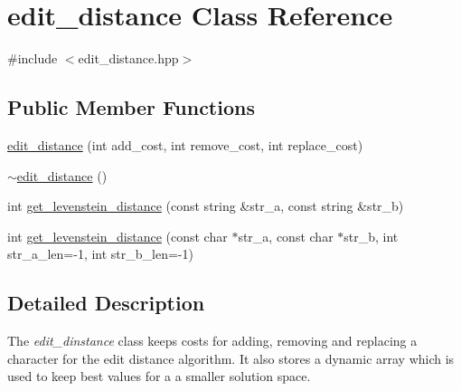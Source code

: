 \hypertarget{classedit__distance}{\section{edit\+\_\+distance Class Reference}
\label{classedit__distance}
}


{\ttfamily \#include $<$edit\+\_\+distance.\+hpp$>$}

\subsection*{Public Member Functions}
\begin{DoxyCompactItemize}
\item 
\hyperlink{classedit__distance_a6aacfb46e57db524db243234ed349bff}{edit\+\_\+distance} (int add\+\_\+cost, int remove\+\_\+cost, int replace\+\_\+cost)
\item 
\hyperlink{classedit__distance_ae2799d0b562cd7e7aacf4719329edda4}{$\sim$edit\+\_\+distance} ()
\item 
int \hyperlink{classedit__distance_afee05eeeefaa9d657d247f05530b51c4}{get\+\_\+levenstein\+\_\+distance} (const string \&str\+\_\+a, const string \&str\+\_\+b)
\item 
int \hyperlink{classedit__distance_a2f059d1dfb3d76e8938376ba907c952c}{get\+\_\+levenstein\+\_\+distance} (const char $\ast$str\+\_\+a, const char $\ast$str\+\_\+b, int str\+\_\+a\+\_\+len=-\/1, int str\+\_\+b\+\_\+len=-\/1)
\end{DoxyCompactItemize}


\subsection{Detailed Description}
The {\itshape edit\+\_\+dinstance} class keeps costs for adding, removing and replacing a character for the edit distance algorithm. It also stores a dynamic array which is used to keep best values for a a smaller solution space. 

